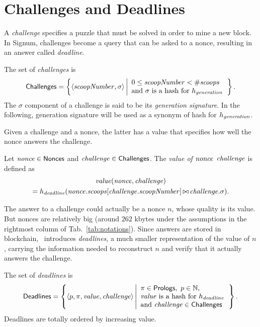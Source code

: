 \section{Challenges and Deadlines}\label{sec:challenges_and_deadlines}

A \emph{challenge} specifies a puzzle that must be solved in order to mine
a new block. In Signum, challenges become a query that can be asked to a nonce, resulting
in an answer called \emph{deadline}.
%
\begin{definition}[Challenge]\label{def:challenge}
  The set of \emph{challenges} is
  \[
  {\mathsf{Challenges}}=\left\{\langle{\mathit{scoopNumber}},\sigma\rangle\left|
  \begin{array}{l}
    0\le{\mathit{scoopNumber}}<{\#\mathit{scoops}}\\
    \text{and $\sigma$ is a hash for $h_{\mathit{generation}}$}
  \end{array}
  \right.\right\}.
  \]
  The $\sigma$ component of a challenge is said to be its \emph{generation signature}.
  In the following, generation signature will be used as a synonym of hash for $h_{\mathit{generation}}$.
\end{definition}
%
Given a challenge and a nonce, the latter has a value that specifies how well
the nonce answers the challenge.
%
\begin{definition}\label{def:nonce_value}
  Let ${\mathit{nonce}}\in{\mathsf{Nonces}}$ and ${\mathit{challenge}}\in{\mathsf{Challenges}}$.
  The \emph{value of ${\mathit{nonce}}$ \wrt ${\mathit{challenge}}$} is defined as
  \begin{multline*}
    \mathit{value}({\mathit{nonce}},{\mathit{challenge}})\\
    =h_{\mathit{deadline}}({\mathit{nonce}}.{\mathit{scoops}}[{\mathit{challenge}}.{\mathit{scoopNumber}}]\operatorname*{\bowtie}{\mathit{challenge}}.\sigma).
  \end{multline*}
\end{definition}
%
The answer to a challenge could actually be a nonce $n$, whose quality is its value.
But nonces are relatively big (around $262$ kbytes under the assumptions in the
rightmost column of Tab.~\ref{tab:notations}). Since answers are stored in blockchain,
\cite{SignumPlotting}~introduces \emph{deadlines}, a much smaller representation of the value of
$n$, carrying the information needed to reconstruct $n$ and verify that it actually
answers the challenge.
%
\begin{definition}[Deadline]\label{def:deadline}
  The set of \emph{deadlines} is
  \[
  {\mathsf{Deadlines}}=\left\{
  \langle p,\pi,\mathit{value},{\mathit{challenge}}\rangle
  \left|\begin{array}{l}
  \pi\in{\mathsf{Prologs}},\ p\in\mathbb{N},\\
  \mathit{value}\text{ is a hash for }h_{\mathit{deadline}}\\
  \text{and }{\mathit{challenge}}\in{\mathsf{Challenges}}
  \end{array}
  \right.
  \right\}.
  \]
  Deadlines are totally ordered by increasing value.
\end{definition}
